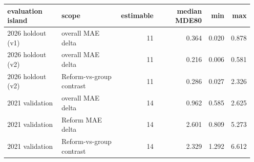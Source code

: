 \begin{tabular}{llrrrr}
\toprule
evaluation island & scope & estimable & median MDE80 & min & max \\
\midrule
2026 holdout (v1) & overall MAE delta & 11 & 0.364 & 0.020 & 0.878 \\
2026 holdout (v2) & overall MAE delta & 11 & 0.216 & 0.006 & 0.581 \\
2026 holdout (v2) & Reform-vs-group contrast & 11 & 0.286 & 0.027 & 2.326 \\
2021 validation & overall MAE delta & 14 & 0.962 & 0.585 & 2.625 \\
2021 validation & Reform MAE delta & 14 & 2.601 & 0.809 & 5.273 \\
2021 validation & Reform-vs-group contrast & 14 & 2.329 & 1.292 & 6.612 \\
\bottomrule
\end{tabular}
